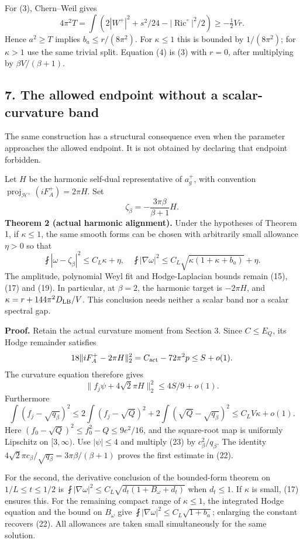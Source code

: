 \documentclass[
  11pt,
]{article}
\begin{document}
For (3), Chern--Weil gives \[
4\pi^2T=\int\left(2|W^+|^2+s^2/24
-|\operatorname{Ric}^{\circ}|^2/2\right)
\ge-\tfrac12 Vr.
\] Hence \(a^2\ge T\) implies \(b_a\le r/(8\pi^2)\). For \(\kappa\le1\)
this is bounded by \(1/(8\pi^2)\); for \(\kappa>1\) use the same trivial
split. Equation (4) is (3) with \(r=0\), after multiplying by
\(\beta V/(\beta+1)\).

\hypertarget{the-allowed-endpoint-without-a-scalar-curvature-band}{%
\subsection{7. The allowed endpoint without a scalar-curvature
band}\label{the-allowed-endpoint-without-a-scalar-curvature-band}}

The same construction has a structural consequence even when the
parameter approaches the allowed endpoint. It is not obtained by
declaring that endpoint forbidden.

Let \(H\) be the harmonic self-dual representative of \(a_g^+\), with
convention \(\operatorname{proj}_{\mathcal H^+}(iF_A^+)=2\pi H\). Set \[
\zeta_\beta=-\frac{3\pi\beta}{\beta+1}H.
\] \textbf{Theorem 2 (actual harmonic alignment).} Under the hypotheses
of Theorem 1, if \(\kappa\le1\), the same smooth forms can be chosen
with arbitrarily small allowance \(\eta>0\) so that \[
\fint|\omega-\zeta_\beta|^2\le C_L\kappa+\eta,
\quad
\fint|\nabla\omega|^2
\le C_L\sqrt{\kappa(1+\kappa+b_a)}+\eta.
\tag{22}
\] The amplitude, polynomial Weyl fit and Hodge-Laplacian bounds remain
(15), (17) and (19). In particular, at \(\beta=2\), the harmonic target
is \(-2\pi H\), and \(\kappa=r+144\pi^2D_{\rm LB}/V\). This conclusion
needs neither a scalar band nor a scalar spectral gap.

\textbf{Proof.} Retain the actual curvature moment from Section 3. Since
\(C\le E_Q\), its Hodge remainder satisfies \[
18\|iF_A^+-2\pi H\|_2^2
=C_{\rm act}-72\pi^2p\le S+o(1).
\] The curvature equation therefore gives \[
\|f_j\psi+4\sqrt2\pi H\|_2^2\le4S/9+o(1).
\tag{23}
\] Furthermore \[
\int(f_j-\sqrt{q_\beta})^2
\le2\int(f_j-\sqrt Q)^2
+2\int(\sqrt Q-\sqrt{q_\beta})^2
\le C_LV\kappa+o(1).
\] Here \((f_0-\sqrt Q)^2\le f_0^2-Q\le9e^2/16\), and the square-root
map is uniformly Lipschitz on \([3,\infty)\). Use \(|\psi|\le4\) and
multiply (23) by \(c_\beta^2/q_\beta\). The identity
\(4\sqrt2\pi c_\beta/\sqrt{q_\beta} =3\pi\beta/(\beta+1)\) proves the
first estimate in (22).

For the second, the derivative conclusion of the bounded-form theorem on
\(1/L\le t\le1/2\) is
\(\fint|\nabla\omega|^2\le C_L\sqrt{d_t(1+B_\omega+d_t)}\) when
\(d_t\le1\). If \(\kappa\) is small, (17) ensures this. For the
remaining compact range of \(\kappa\le1\), the integrated Hodge equation
and the bound on \(B_\omega\) give
\(\fint|\nabla\omega|^2\le C_L\sqrt{1+b_a}\); enlarging the constant
recovers (22). All allowances are taken small simultaneously for the
same solution.
\end{document}

